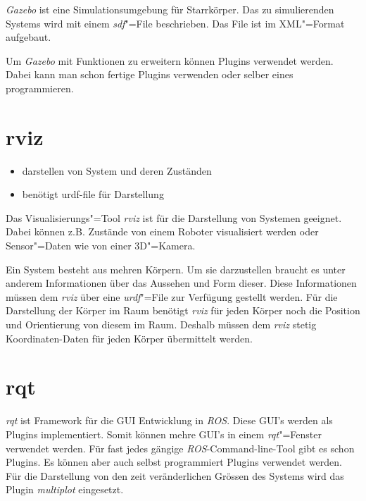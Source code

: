 \textit{Gazebo} ist eine Simulationsumgebung für Starrkörper.
Das zu simulierenden Systems wird mit einem \textit{sdf}"=File beschrieben. %
Das File ist im XML"=Format aufgebaut.

Um \textit{Gazebo} mit Funktionen zu erweitern können Plugins verwendet werden.
Dabei kann man schon fertige Plugins verwenden oder selber eines programmieren. %

\section{rviz}
\begin{itemize}
\item darstellen von System und deren Zuständen
\item benötigt urdf-file für Darstellung
\end{itemize}
Das Visualisierungs"=Tool \textit{rviz} ist für die Darstellung von Systemen geeignet.
Dabei können z.B. Zustände von einem Roboter visualisiert werden oder Sensor"=Daten wie von einer 3D"=Kamera.

Ein System besteht aus mehren Körpern.
Um sie darzustellen braucht es unter anderem Informationen über das Aussehen und Form dieser.
Diese Informationen müssen dem \textit{rviz} über eine \textit{urdf}"=File zur Verfügung gestellt werden. %
Für die Darstellung der Körper im Raum benötigt \textit{rviz} für jeden Körper noch die Position und Orientierung von diesem im Raum.
Deshalb müssen dem \textit{rviz} stetig Koordinaten-Daten für jeden Körper übermittelt werden. %


\section{rqt}
\textit{rqt} ist Framework für die GUI Entwicklung in \textit{ROS}.
Diese GUI's werden als Plugins implementiert.
Somit können mehre GUI's in einem \textit{rqt}"=Fenster verwendet werden.
Für fast jedes gängige \textit{ROS}-Command-line-Tool gibt es schon Plugins. %
Es können aber auch selbst programmiert Plugins verwendet werden. 
Für die Darstellung von den zeit veränderlichen Grössen des Systems wird das Plugin \textit{multiplot} eingesetzt. %



